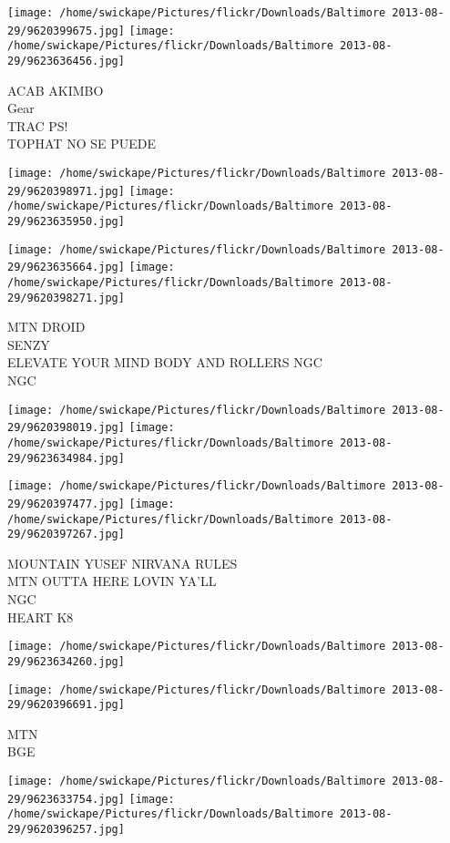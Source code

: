 \documentclass[10pt,letterpaper]{article}
\begin{document}
\texttt{[image: /home/swickape/Pictures/flickr/Downloads/Baltimore 2013-08-29/9620399675.jpg]}
\texttt{[image: /home/swickape/Pictures/flickr/Downloads/Baltimore 2013-08-29/9623636456.jpg]}

ACAB AKIMBO\\
Gear\\
TRAC PS!\\
TOPHAT NO SE PUEDE
\pagebreak

\texttt{[image: /home/swickape/Pictures/flickr/Downloads/Baltimore 2013-08-29/9620398971.jpg]}
\texttt{[image: /home/swickape/Pictures/flickr/Downloads/Baltimore 2013-08-29/9623635950.jpg]}

\texttt{[image: /home/swickape/Pictures/flickr/Downloads/Baltimore 2013-08-29/9623635664.jpg]}
\texttt{[image: /home/swickape/Pictures/flickr/Downloads/Baltimore 2013-08-29/9620398271.jpg]}

MTN DROID\\
SENZY\\
ELEVATE YOUR MIND BODY AND ROLLERS NGC\\
NGC
\pagebreak

\texttt{[image: /home/swickape/Pictures/flickr/Downloads/Baltimore 2013-08-29/9620398019.jpg]}
\texttt{[image: /home/swickape/Pictures/flickr/Downloads/Baltimore 2013-08-29/9623634984.jpg]}

\texttt{[image: /home/swickape/Pictures/flickr/Downloads/Baltimore 2013-08-29/9620397477.jpg]}
\texttt{[image: /home/swickape/Pictures/flickr/Downloads/Baltimore 2013-08-29/9620397267.jpg]}

MOUNTAIN YUSEF NIRVANA RULES\\
MTN OUTTA HERE LOVIN YA'LL\\
NGC\\
HEART K8
\pagebreak

\texttt{[image: /home/swickape/Pictures/flickr/Downloads/Baltimore 2013-08-29/9623634260.jpg]}

\vspace{0.25in}
\texttt{[image: /home/swickape/Pictures/flickr/Downloads/Baltimore 2013-08-29/9620396691.jpg]}

MTN\\
BGE
\pagebreak

\texttt{[image: /home/swickape/Pictures/flickr/Downloads/Baltimore 2013-08-29/9623633754.jpg]}
\texttt{[image: /home/swickape/Pictures/flickr/Downloads/Baltimore 2013-08-29/9620396257.jpg]}
\end{document}
